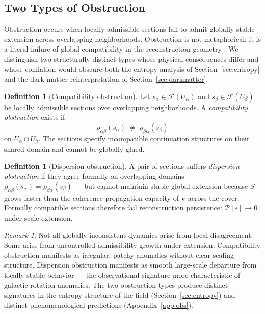 \documentclass[11pt, a4paper]{article}
\theoremstyle{plain}
\theoremstyle{definition}
\newtheorem{definition}[theorem]{Definition}
\theoremstyle{remark}
\newtheorem{remark}[theorem]{Remark}
\newcommand{\sheaf}{\mathcal{F}}
\begin{document}
\subsection{Two Types of Obstruction}

Obstruction occurs when locally admissible sections fail to admit globally stable
extension across overlapping neighborhoods. Obstruction is not metaphorical: it is a
literal failure of global compatibility in the reconstruction geometry
\cite{bott1982,hatcher2002}. We distinguish two structurally distinct types whose
physical consequences differ and whose conflation would obscure both the entropy
analysis of Section~\ref{sec:entropy} and the dark matter reinterpretation of
Section~\ref{sec:darkmatter}.

\begin{definition}[Compatibility obstruction]
\label{def:compat-obs}
Let $s_\alpha \in \sheaf(U_\alpha)$ and $s_\beta \in \sheaf(U_\beta)$ be locally
admissible sections over overlapping neighborhoods. A \emph{compatibility
obstruction} exists if
\[
  \rho_{\alpha\beta}(s_\alpha) \;\neq\; \rho_{\beta\alpha}(s_\beta)
\]
on $U_\alpha \cap U_\beta$. The sections specify incompatible continuation structures
on their shared domain and cannot be globally glued.
\end{definition}

\begin{definition}[Dispersion obstruction]
\label{def:disp-obs}
A pair of sections suffers \emph{dispersion obstruction} if they agree formally on
overlapping domains --- $\rho_{\alpha\beta}(s_\alpha) = \rho_{\beta\alpha}(s_\beta)$
--- but cannot maintain stable global extension because $S$ grows faster than the
coherence propagation capacity of $\mathbf{v}$ across the cover. Formally compatible
sections therefore fail reconstruction persistence: $\mathcal{P}[s] \to 0$ under
scale extension.
\end{definition}

\begin{remark}
Not all globally inconsistent dynamics arise from local disagreement. Some arise from
uncontrolled admissibility growth under extension. Compatibility obstruction manifests
as irregular, patchy anomalies without clear scaling structure. Dispersion obstruction
manifests as smooth large-scale departure from locally stable behavior --- the
observational signature more characteristic of galactic rotation anomalies. The two
obstruction types produce distinct signatures in the entropy structure of the field
(Section~\ref{sec:entropy}) and distinct phenomenological predictions
(Appendix~\ref{app:obs}).
\end{remark}
\end{document}

